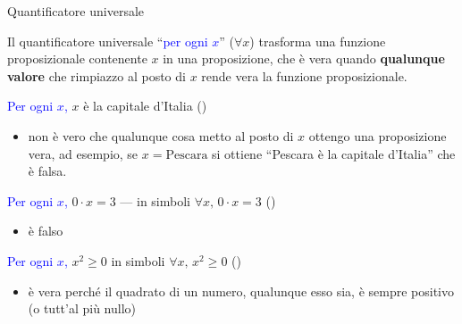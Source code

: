 \documentclass[aspectratio=169,10pt]{beamer}
\newcommand{\xmark}{{\color{red}{\ding{55}}}}
\newcommand{\quant}[1]{\textcolor{blue}{#1}}
\begin{document}
\begin{frame}{Quantificatore universale}

    \begin{definition}
        Il quantificatore universale ``\quant{per ogni $x$}'' ($\forall x$) trasforma una funzione proposizionale contenente $x$ in una proposizione, che è vera quando \textbf{qualunque valore} che rimpiazzo al posto di $x$ rende vera la funzione proposizionale.
    \end{definition}

    \begin{example}
        \quant{Per ogni $x$,} $x$ è la capitale d'Italia \pause (\xmark)
        \begin{itemize}
        \item non è vero che qualunque cosa metto al posto di $x$ ottengo una proposizione vera, ad esempio, se $x=\text{Pescara}$ si ottiene ``Pescara è la capitale d'Italia'' che è falsa.
        \end{itemize}
        \pause
        \quant{Per ogni $x$,} $0 \cdot x = 3$ --- in simboli $\forall x, \, 0 \cdot x = 3$  \pause (\xmark)
        \begin{itemize}
            \item è falso
        \end{itemize}
        \pause
        \quant{Per ogni $x$,} $x^2 \geq 0$  in simboli $\forall x, \, x^2 \geq 0$ \pause (\checkmark)
        \begin{itemize}
            \item è vera perché il quadrato di un numero, qualunque esso sia, è sempre positivo (o tutt'al più nullo)
        \end{itemize}
    \end{example}
\end{frame}
\end{document}
